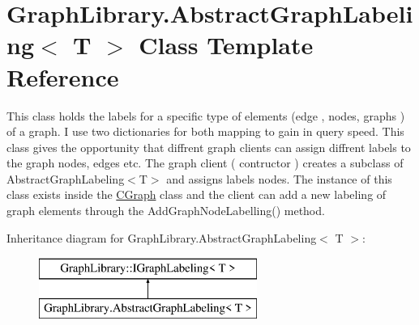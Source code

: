 \hypertarget{class_graph_library_1_1_abstract_graph_labeling}{}\section{Graph\+Library.\+Abstract\+Graph\+Labeling$<$ T $>$ Class Template Reference}
\label{class_graph_library_1_1_abstract_graph_labeling}


This class holds the labels for a specific type of elements (edge , nodes, graphs ) of a graph. I use two dictionaries for both mapping to gain in query speed. This class gives the opportunity that diffrent graph clients can assign diffrent labels to the graph nodes, edges etc. The graph client ( contructor ) creates a subclass of Abstract\+Graph\+Labeling$<$\+T$>$ and assigns labels nodes. The instance of this class exists inside the \hyperlink{class_graph_library_1_1_c_graph}{C\+Graph} class and the client can add a new labeling of graph elements through the Add\+Graph\+Node\+Labelling() method.  


Inheritance diagram for Graph\+Library.\+Abstract\+Graph\+Labeling$<$ T $>$\+:\begin{figure}[H]
\begin{center}
\leavevmode
\includegraphics[height=2.000000cm]{class_graph_library_1_1_abstract_graph_labeling}
\end{center}
\end{figure}
